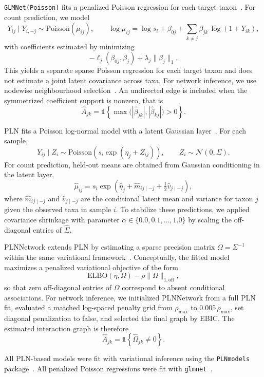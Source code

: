 \documentclass{jmlr}
\begin{document}
\texttt{GLMNet(Poisson)} fits a penalized Poisson regression for each target taxon~\cite{Friedman2010}.
For count prediction, we model
\[
Y_{ij} \mid Y_{i,-j} \sim \mathrm{Poisson}(\mu_{ij}),
\qquad
\log \mu_{ij} = \log s_i + \beta_{0j} + \sum_{k \neq j} \beta_{jk}\,\log(1 + Y_{ik}),
\]
with coefficients estimated by minimizing
\[
-\ell_j(\beta_{0j}, \beta_j) + \lambda_j \lVert \beta_j \rVert_1.
\]
This yields a separate sparse Poisson regression for each target taxon and does not estimate a joint latent covariance across taxa.
For network inference, we use nodewise neighbourhood selection~\cite{Meinshausen2006}.
An undirected edge is included when the symmetrized coefficient support is nonzero, that is
\[
\hat{A}_{jk} = \mathbb{1}\!\left\{\max\!\big(|\hat{\beta}_{jk}|, |\hat{\beta}_{kj}|\big) > 0\right\}.
\]

PLN fits a Poisson log-normal model with a latent Gaussian layer~\cite{aitchison1989multivariate,Chiquet2021}.
For each sample,
\[
Y_{ij} \mid Z_i \sim \mathrm{Poisson}\!\left(s_i \exp(\eta_j + Z_{ij})\right),
\qquad
Z_i \sim \mathcal{N}(0, \Sigma).
\]
For count prediction, held-out means are obtained from Gaussian conditioning in the latent layer,
\[
\hat{\mu}_{ij}
=
s_i \exp\!\left(\hat{\eta}_j + \hat{m}_{ij \mid -j} + \tfrac{1}{2}\hat{v}_{j \mid -j}\right),
\]
where $\hat{m}_{ij \mid -j}$ and $\hat{v}_{j \mid -j}$ are the conditional latent mean and variance for taxon $j$ given the observed taxa in sample $i$.
To stabilize these predictions, we applied covariance shrinkage with parameter $\alpha \in \{0.0, 0.1, \ldots, 1.0\}$ by scaling the off-diagonal entries of $\hat{\Sigma}$.

PLNNetwork extends PLN by estimating a sparse precision matrix $\Omega = \Sigma^{-1}$ within the same variational framework~\cite{chiquet2019variational,Chiquet2021}.
Conceptually, the fitted model maximizes a penalized variational objective of the form
\[
\mathrm{ELBO}(\eta, \Omega) - \rho \lVert \Omega \rVert_{1,\mathrm{off}},
\]
so that zero off-diagonal entries of $\Omega$ correspond to absent conditional associations.
For network inference, we initialized PLNNetwork from a full PLN fit, evaluated a matched log-spaced penalty grid from $\rho_{\max}$ to $0.005\,\rho_{\max}$, set diagonal penalization to false, and selected the final graph by EBIC.
The estimated interaction graph is therefore
\[
\hat{A}_{jk} = \mathbb{1}\!\left\{\hat{\Omega}_{jk} \neq 0\right\}.
\]

All PLN-based models were fit with variational inference using the \texttt{PLNmodels} package~\cite{Chiquet2021}.
All penalized Poisson regressions were fit with \texttt{glmnet}~\cite{Friedman2010}.
\end{document}
